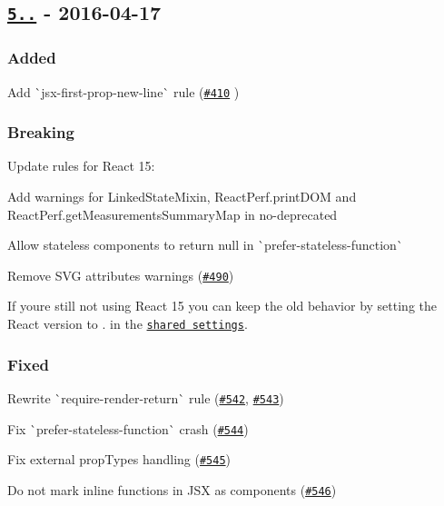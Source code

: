 \subsection*{\href{https://github.com/yannickcr/eslint-plugin-react/compare/v4.3.0...v5.0.0}{\tt 5..} -\/ 2016-\/04-\/17}

\subsubsection*{Added}


\begin{DoxyItemize}
\item Add \`{}jsx-\/first-\/prop-\/new-\/line\`{} rule (\href{https://github.com/yannickcr/eslint-plugin-react/issues/410}{\tt \#410} )
\end{DoxyItemize}

\subsubsection*{Breaking}


\begin{DoxyItemize}
\item Update rules for React 15\+:
\begin{DoxyItemize}
\item Add warnings for {\ttfamily Linked\+State\+Mixin}, {\ttfamily React\+Perf.\+print\+D\+OM} and {\ttfamily React\+Perf.\+get\+Measurements\+Summary\+Map} in {\ttfamily no-\/deprecated}
\item Allow stateless components to return {\ttfamily null} in \`{}prefer-\/stateless-\/function\`{}
\item Remove S\+VG attributes warnings (\href{https://github.com/yannickcr/eslint-plugin-react/issues/490}{\tt \#490})
\end{DoxyItemize}
\end{DoxyItemize}

If you\textquotesingle{}re still not using React 15 you can keep the old behavior by setting the React version to {.} in the \href{README.md#configuration}{\tt shared settings}.

\subsubsection*{Fixed}


\begin{DoxyItemize}
\item Rewrite \`{}require-\/render-\/return\`{} rule (\href{https://github.com/yannickcr/eslint-plugin-react/issues/542}{\tt \#542}, \href{https://github.com/yannickcr/eslint-plugin-react/issues/543}{\tt \#543})
\item Fix \`{}prefer-\/stateless-\/function\`{} crash (\href{https://github.com/yannickcr/eslint-plugin-react/issues/544}{\tt \#544})
\item Fix external prop\+Types handling (\href{https://github.com/yannickcr/eslint-plugin-react/issues/545}{\tt \#545})
\item Do not mark inline functions in J\+SX as components (\href{https://github.com/yannickcr/eslint-plugin-react/issues/546}{\tt \#546})
\end{DoxyItemize}

